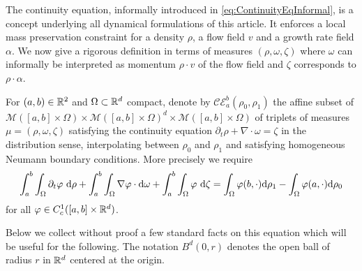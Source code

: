 The continuity equation, informally introduced in \eqref{eq:ContinuityEqInformal}, is a concept underlying all dynamical formulations of this article. It enforces a local mass preservation constraint for a density $\rho$, a flow field $v$ and a growth rate field $\alpha$.
We now give a rigorous definition in terms of measures $(\rho,\omega,\zeta)$ where $\omega$ can informally be interpreted as momentum $\rho \cdot v$ of the flow field and $\zeta$ corresponds to $\rho \cdot \alpha$.
%
\begin{definition}
\label{def:continuity equation}
For $(a,b)\in \mathbb{R}^2$ and $\Omega \subset \mathbb{R}^d$ compact, denote by $\mathcal{CE}_a^b(\rho_0,\rho_1)$ the affine subset of $\mathcal{M}([a,b]\times \Omega)\times \mathcal{M}([a,b]\times \Omega)^d \times \mathcal{M}([a,b]\times \Omega)$ of triplets of measures $\mu=(\rho,\omega,\zeta)$ satisfying the continuity equation $\partial_t \rho + \nabla \cdot \omega = \zeta$ in the distribution sense, interpolating between $\rho_0$ and $\rho_1$ and satisfying homogeneous Neumann boundary conditions. More precisely we require
\begin{equation}
\label{eq:continuity weak}
\int_a^b \int_{\Omega} \partial_t \varphi \ \mathrm{d}\rho + \int_a^b \int_{\Omega} \nabla \varphi \cdot \mathrm{d}\omega + \int_a^b \int_{\Omega} \varphi \ \mathrm{d}\zeta = \int_{\Omega} \varphi(b,\cdot)\mathrm{d}\rho_1 - \int_{\Omega} \varphi(a,\cdot)\mathrm{d}\rho_0
\end{equation}
for all $\varphi \in C^1_c([a,b]\times \mathbb{R}^d)$.
\end{definition}
%
Below we collect without proof a few standard facts on this equation which will be useful for the following. The notation $B^d(0,r)$ denotes the open ball of radius $r$ in $\mathbb{R}^d$ centered at the origin.
